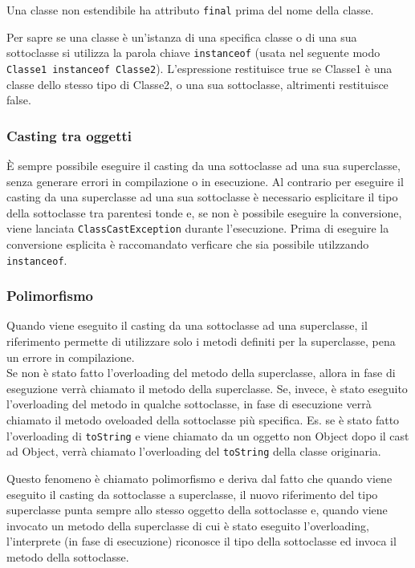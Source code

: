 \documentclass{article}
\begin{document}
Una classe non estendibile ha attributo \verb|final| prima del nome della classe.

Per sapre se una classe è un'istanza di una specifica classe o di una sua sottoclasse si utilizza la parola chiave \verb|instanceof|
(usata nel seguente modo \verb|Classe1 instanceof Classe2|). L'espressione restituisce true se Classe1 è una classe dello stesso tipo di Classe2, o una sua
sottoclasse, altrimenti restituisce false.

\newpage


\subsubsection*{Casting tra oggetti}
È sempre possibile eseguire il casting da una sottoclasse ad una sua superclasse, senza generare errori in compilazione o in esecuzione.
Al contrario per eseguire il casting da una superclasse ad una sua sottoclasse è necessario esplicitare il tipo della sottoclasse tra
parentesi tonde e, se non è possibile eseguire la conversione, viene lanciata \verb|ClassCastException| durante l'esecuzione.
Prima di eseguire la conversione esplicita è raccomandato verficare che sia possibile utilzzando \verb|instanceof|.

\subsubsection*{Polimorfismo}
Quando viene eseguito il casting da una sottoclasse ad una superclasse, il  riferimento permette di utilizzare solo i metodi
definiti per la superclasse, pena un errore in compilazione. \\
Se non è stato fatto l'overloading del metodo della superclasse, allora in fase di eseguzione verrà chiamato il metodo della superclasse.
Se, invece, è stato eseguito l'overloading del metodo in qualche sottoclasse, in fase di esecuzione verrà chiamato il metodo oveloaded
della sottoclasse più specifica.
Es. se è stato fatto l'overloading di \verb|toString| e viene chiamato da un oggetto non Object dopo il cast ad Object, verrà chiamato
l'overloading del \verb|toString| della classe originaria.

Questo fenomeno è chiamato polimorfismo e deriva dal fatto che quando viene eseguito il casting da sottoclasse a superclasse, il nuovo
riferimento del tipo superclasse punta sempre allo stesso oggetto della sottoclasse e, quando viene invocato un metodo della superclasse
di cui è stato eseguito l'overloading, l'interprete (in fase di esecuzione) riconosce il tipo della sottoclasse ed invoca il metodo
della sottoclasse.
\end{document}
